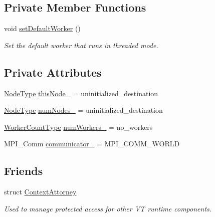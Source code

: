 \subsection*{Private Member Functions}
\begin{DoxyCompactItemize}
\item 
void \hyperlink{structvt_1_1ctx_1_1_context_ab61a961c47c8fc6393df8c121ade3aa2}{set\+Default\+Worker} ()
\begin{DoxyCompactList}\small\item\em Set the default worker that runs in threaded mode. \end{DoxyCompactList}\end{DoxyCompactItemize}
\subsection*{Private Attributes}
\begin{DoxyCompactItemize}
\item 
\hyperlink{namespacevt_a866da9d0efc19c0a1ce79e9e492f47e2}{Node\+Type} \hyperlink{structvt_1_1ctx_1_1_context_a5fcea79d2fede6e9945433621894624c}{this\+Node\+\_\+} = uninitialized\+\_\+destination
\item 
\hyperlink{namespacevt_a866da9d0efc19c0a1ce79e9e492f47e2}{Node\+Type} \hyperlink{structvt_1_1ctx_1_1_context_a58cc20215314e915f43b829ad0470299}{num\+Nodes\+\_\+} = uninitialized\+\_\+destination
\item 
\hyperlink{namespacevt_aa93398ea48f2cb6c188512250f7cc248}{Worker\+Count\+Type} \hyperlink{structvt_1_1ctx_1_1_context_a16e8488c6e6ad26c387ad6ef19f726b9}{num\+Workers\+\_\+} = no\+\_\+workers
\item 
M\+P\+I\+\_\+\+Comm \hyperlink{structvt_1_1ctx_1_1_context_ac9f5afa2cb9a6c06c8570bbf25cde926}{communicator\+\_\+} = M\+P\+I\+\_\+\+C\+O\+M\+M\+\_\+\+W\+O\+R\+LD
\end{DoxyCompactItemize}
\subsection*{Friends}
\begin{DoxyCompactItemize}
\item 
struct \hyperlink{structvt_1_1ctx_1_1_context_a75c33a90ea59b21ab5375343af0f8e26}{Context\+Attorney}
\begin{DoxyCompactList}\small\item\em Used to manage protected access for other VT runtime components. \end{DoxyCompactList}\end{DoxyCompactItemize}
